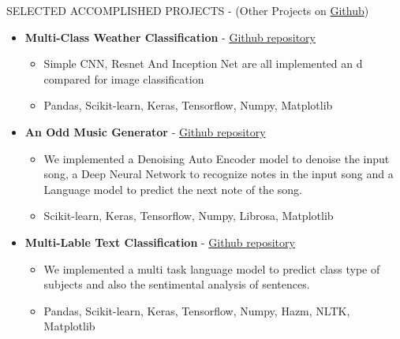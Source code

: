 \documentclass[]{CV}
\begin{document}
\begin{section}{SELECTED ACCOMPLISHED PROJECTS { - (Other Projects on \href{https://github.com/amirkasaei}{Github})}}
\begin{itemize}
    
     \item \textbf{Multi-Class Weather Classification} - \href{https://github.com/amirkasaei/Multi-Class-Weather-Classification}{Github repository}
   \begin{itemize}
        \item Simple CNN, Resnet And Inception Net are all implemented an d compared for image classification
        \item  Pandas, Scikit-learn, Keras, Tensorflow, Numpy, Matplotlib
    \end{itemize}
    
\pagebreak  
\item \textbf{An Odd Music Generator} - \href{https://github.com/amirkasaei/An-Odd-Music-Generator}{Github repository}
   \begin{itemize}
        \item We implemented a Denoising Auto Encoder model to denoise the input song, a Deep Neural Network to recognize notes in the input song and a Language model to predict the next note of  the song.\vspace{-2mm}
        \item Scikit-learn, Keras, Tensorflow, Numpy, Librosa, Matplotlib
    \end{itemize} 
    
    
   \item \textbf{Multi-Lable Text Classification} - \href{https://github.com/amirkasaei/Multi-Lable-Text-Classification}{Github repository}
   \begin{itemize}
        \item We implemented a multi task language model to predict class type of subjects and also the sentimental analysis of sentences.\vspace{-2mm}
        \item Pandas, Scikit-learn, Keras, Tensorflow, Numpy, Hazm, NLTK, Matplotlib
    \end{itemize}


\end{itemize}
\end{section}
\end{document}
